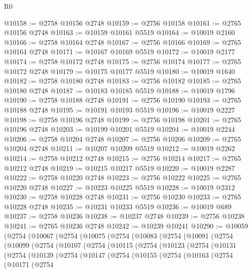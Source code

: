 \begin{lexlean}{R0}
\begin{coremodule}
@10158 := @2758 @10156 @2748
@10159 := @2756 @10158
@10161 := @2765 @10156 @2748
@10163 := @10159 @10161 @5519
@10164 := @10019 @2160
@10166 := @2758 @10164 @2748
@10167 := @2756 @10166
@10169 := @2765 @10164 @2748
@10171 := @10167 @10169 @5519
@10172 := @10019 @2177
@10174 := @2758 @10172 @2748
@10175 := @2756 @10174
@10177 := @2765 @10172 @2748
@10179 := @10175 @10177 @5519
@10180 := @10019 @1640
@10182 := @2758 @10180 @2748
@10183 := @2756 @10182
@10185 := @2765 @10180 @2748
@10187 := @10183 @10185 @5519
@10188 := @10019 @1796
@10190 := @2758 @10188 @2748
@10191 := @2756 @10190
@10193 := @2765 @10188 @2748
@10195 := @10191 @10193 @5519
@10196 := @10019 @2227
@10198 := @2758 @10196 @2748
@10199 := @2756 @10198
@10201 := @2765 @10196 @2748
@10203 := @10199 @10201 @5519
@10204 := @10019 @2244
@10206 := @2758 @10204 @2748
@10207 := @2756 @10206
@10209 := @2765 @10204 @2748
@10211 := @10207 @10209 @5519
@10212 := @10019 @2262
@10214 := @2758 @10212 @2748
@10215 := @2756 @10214
@10217 := @2765 @10212 @2748
@10219 := @10215 @10217 @5519
@10220 := @10019 @2287
@10222 := @2758 @10220 @2748
@10223 := @2756 @10222
@10225 := @2765 @10220 @2748
@10227 := @10223 @10225 @5519
@10228 := @10019 @2312
@10230 := @2758 @10228 @2748
@10231 := @2756 @10230
@10233 := @2765 @10228 @2748
@10235 := @10231 @10233 @5519
@10236 := @10019 @689
@10237 := @2758 @10236
@10238 := @10237 @2748
@10239 := @2756 @10238
@10241 := @2765 @10236 @2748
@10242 := @10239 @10241
@10290 := @10059
    (@2754
      (@10067
        (@2754
          (@10075
            (@2754
              (@10083
                (@2754
                  (@10091
                    (@2754
                      (@10099
                        (@2754
                          (@10107
                            (@2754
                              (@10115
                                (@2754
                                  (@10123
                                    (@2754
                                      (@10131
                                        (@2754
                                          (@10139
                                            (@2754
                                              (@10147
                                                (@2754
                                                  (@10155
                                                    (@2754
                                                      (@10163
                                                        (@2754
                                                          (@10171
                                                            (@2754

\end{coremodule}
\end{lexlean}

